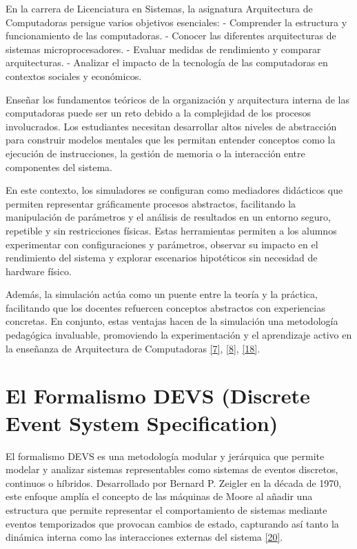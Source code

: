 \documentclass[12pt,oneside]{templates/unerthesis}
\begin{document}
En la carrera de Licenciatura en Sistemas, la asignatura Arquitectura de Computadoras persigue varios objetivos esenciales:
- Comprender la estructura y funcionamiento de las computadoras.
- Conocer las diferentes arquitecturas de sistemas microprocesadores.
- Evaluar medidas de rendimiento y comparar arquitecturas.
- Analizar el impacto de la tecnología de las computadoras en contextos sociales y económicos.

Enseñar los fundamentos teóricos de la organización y arquitectura interna de las computadoras puede ser un reto debido a la complejidad de los procesos involucrados. Los estudiantes necesitan desarrollar altos niveles de abstracción para construir modelos mentales que les permitan entender conceptos como la ejecución de instrucciones, la gestión de memoria o la interacción entre componentes del sistema.

En este contexto, los simuladores se configuran como mediadores didácticos que permiten representar gráficamente procesos abstractos, facilitando la manipulación de parámetros y el análisis de resultados en un entorno seguro, repetible y sin restricciones físicas. Estas herramientas permiten a los alumnos experimentar con configuraciones y parámetros, observar su impacto en el rendimiento del sistema y explorar escenarios hipotéticos sin necesidad de hardware físico.

Además, la simulación actúa como un puente entre la teoría y la práctica, facilitando que los docentes refuercen conceptos abstractos con experiencias concretas. En conjunto, estas ventajas hacen de la simulación una metodología pedagógica invaluable, promoviendo la experimentación y el aprendizaje activo en la enseñanza de Arquitectura de Computadoras \protect\hyperlink{ref-garcia-garcia_pbbcache_2020}{{[}7{]}}, \protect\hyperlink{ref-nova_tool_2013}{{[}8{]}}, \protect\hyperlink{ref-skrien_cpu_2001}{{[}18{]}}.

\hypertarget{el-formalismo-devs-discrete-event-system-specification}{%
\section{El Formalismo DEVS (Discrete Event System Specification)}\label{el-formalismo-devs-discrete-event-system-specification}}

El formalismo DEVS es una metodología modular y jerárquica que permite modelar y analizar sistemas representables como sistemas de eventos discretos, continuos o híbridos. Desarrollado por Bernard P. Zeigler en la década de 1970, este enfoque amplía el concepto de las máquinas de Moore al añadir una estructura que permite representar el comportamiento de sistemas mediante eventos temporizados que provocan cambios de estado, capturando así tanto la dinámica interna como las interacciones externas del sistema \protect\hyperlink{ref-zeigler_theory_2000}{{[}20{]}}.
\end{document}
